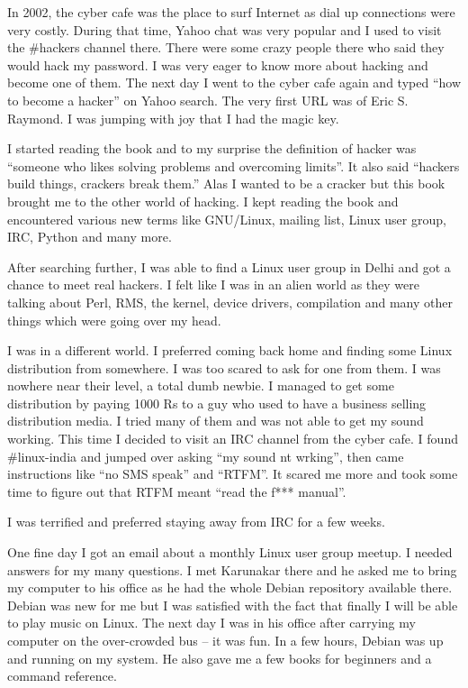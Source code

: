 

\noindent{}In 2002, the cyber cafe was the place to surf Internet as dial up connections
were very costly. During that time, Yahoo chat was very popular and I used to
visit the \#hackers channel there. There were some crazy people there who said they
would hack my password. I was very eager to know more about hacking and become
one of them. The next day I went to the cyber cafe again and typed ``how to become a
hacker'' on Yahoo search. The very first URL was of Eric S. Raymond. I was jumping
with joy that I had the magic key.
 
I started reading the book and to my surprise the definition of hacker was
``someone who likes solving problems and overcoming limits''. It also said
``hackers build things, crackers break them.'' Alas I wanted to be a cracker but
this book brought me to the other world of hacking. I kept reading the book and
encountered various new terms like GNU/Linux, mailing list, Linux user group,
IRC, Python and many more. 

After searching further, I was able to find a Linux user group in
Delhi and got a chance to meet real hackers. I felt like I was in an
alien world as they were talking about Perl, RMS, the kernel, device
drivers, compilation and many other things which were going over my
head.

I was in a different world. I preferred coming back home and finding some
Linux distribution from somewhere. I was too scared to ask for one
from them. I was nowhere near their level, a total dumb newbie. I managed to get some
distribution by paying 1000 Rs to a guy who used to have a business
selling distribution media. I tried many of them and was not able to
get my sound working. This time I decided to visit an IRC channel from
the cyber cafe. I found \#linux-india and jumped over asking ``my sound
nt wrking'', then came instructions like ``no SMS speak'' and ``RTFM''. It
scared me more and took some time to figure out that RTFM meant ``read the
f*** manual''.

I was terrified and preferred staying away from IRC for a few weeks.

One fine day I got an email about a monthly Linux user group meetup. I
needed answers for my many questions. I met Karunakar there and he
asked me to bring my computer to his office as he had the whole Debian
repository available there. Debian was new for me but I was
satisfied with the fact that finally I will be able to play music on
Linux. The next day I was in his office after carrying my computer on the
over-crowded bus -- it was fun. In a few hours, Debian was up and running on my
system. He also gave me a few books for beginners and a command reference.

